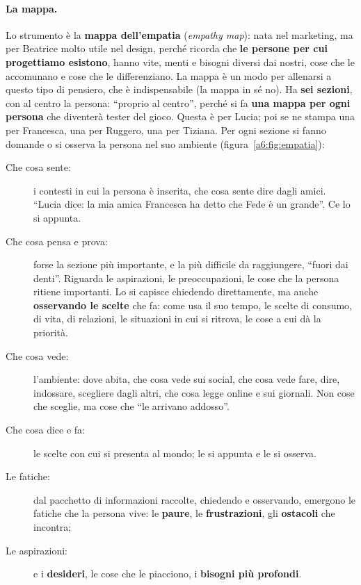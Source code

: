 \paragraph{La mappa.} Lo strumento è la \textbf{mappa dell'empatia} (\emph{empathy
map}): nata nel marketing, ma per Beatrice molto utile nel design, perché ricorda che
\textbf{le persone per cui progettiamo esistono}, hanno vite, menti e bisogni diversi
dai nostri, cose che le accomunano e cose che le differenziano. La mappa è un modo per
allenarsi a questo tipo di pensiero, che è indispensabile (la mappa in sé no). Ha
\textbf{sei sezioni}, con al centro la persona: ``proprio al centro'', perché si fa
\textbf{una mappa per ogni persona} che diventerà tester del gioco. Questa è per Lucia;
poi se ne stampa una per Francesca, una per Ruggero, una per Tiziana. Per ogni sezione
si fanno domande o si osserva la persona nel suo ambiente (figura~\ref{a6:fig:empatia}):
\begin{description}
  \item[Che cosa sente:] i contesti in cui la persona è inserita, che cosa sente
        dire dagli amici. ``Lucia dice: la mia amica Francesca ha detto che Fede è un
        grande''. Ce lo si appunta.
  \item[Che cosa pensa e prova:] forse la sezione più importante, e la più difficile
        da raggiungere, ``fuori dai denti''. Riguarda le aspirazioni, le
        preoccupazioni, le cose che la persona ritiene importanti. Lo si capisce
        chiedendo direttamente, ma anche \textbf{osservando le scelte} che fa: come usa
        il suo tempo, le scelte di consumo, di vita, di relazioni, le situazioni in
        cui si ritrova, le cose a cui dà la priorità.
  \item[Che cosa vede:] l'ambiente: dove abita, che cosa vede sui social, che cosa
        vede fare, dire, indossare, scegliere dagli altri, che cosa legge online e sui
        giornali. Non cose che sceglie, ma cose che ``le arrivano addosso''.
  \item[Che cosa dice e fa:] le scelte con cui si presenta al mondo; le si appunta e
        le si osserva.
  \item[Le fatiche:] dal pacchetto di informazioni raccolte, chiedendo e osservando,
        emergono le fatiche che la persona vive: le \textbf{paure}, le
        \textbf{frustrazioni}, gli \textbf{ostacoli} che incontra;
  \item[Le aspirazioni:] e i \textbf{desideri}, le cose che le piacciono, i
        \textbf{bisogni più profondi}.
\end{description}

